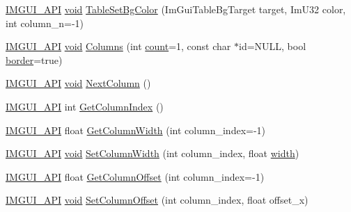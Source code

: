 \begin{DoxyCompactItemize}
\item 
\hyperlink{imgui_8h_a43829975e84e45d1149597467a14bbf5}{I\+M\+G\+U\+I\+\_\+\+A\+PI} \hyperlink{imgui__impl__opengl3__loader_8h_ac668e7cffd9e2e9cfee428b9b2f34fa7}{void} \hyperlink{namespaceImGui_ae8fa85b0cea3c12f73d9432cab64d50a}{Table\+Set\+Bg\+Color} (Im\+Gui\+Table\+Bg\+Target target, Im\+U32 color, int column\+\_\+n=-\/1)
\item 
\hyperlink{imgui_8h_a43829975e84e45d1149597467a14bbf5}{I\+M\+G\+U\+I\+\_\+\+A\+PI} \hyperlink{imgui__impl__opengl3__loader_8h_ac668e7cffd9e2e9cfee428b9b2f34fa7}{void} \hyperlink{namespaceImGui_a0e2889956542527c4039b6b8bf5c2a38}{Columns} (int \hyperlink{imgui__impl__opengl3__loader_8h_a619bc20e8198de3bd3f3d7fc34de66b2}{count}=1, const char $\ast$id=N\+U\+LL, bool \hyperlink{imgui__impl__opengl3__loader_8h_a04bf50a0ceff267d0040a99e545d74e9}{border}=true)
\item 
\hyperlink{imgui_8h_a43829975e84e45d1149597467a14bbf5}{I\+M\+G\+U\+I\+\_\+\+A\+PI} \hyperlink{imgui__impl__opengl3__loader_8h_ac668e7cffd9e2e9cfee428b9b2f34fa7}{void} \hyperlink{namespaceImGui_a8f97746d6a9d59c8400c26fb7613a2ff}{Next\+Column} ()
\item 
\hyperlink{imgui_8h_a43829975e84e45d1149597467a14bbf5}{I\+M\+G\+U\+I\+\_\+\+A\+PI} int \hyperlink{namespaceImGui_acc31f8eea4fcfb86edeb3ac12d82fc05}{Get\+Column\+Index} ()
\item 
\hyperlink{imgui_8h_a43829975e84e45d1149597467a14bbf5}{I\+M\+G\+U\+I\+\_\+\+A\+PI} float \hyperlink{namespaceImGui_a3d205d86dab5ca0763a92997283ac36e}{Get\+Column\+Width} (int column\+\_\+index=-\/1)
\item 
\hyperlink{imgui_8h_a43829975e84e45d1149597467a14bbf5}{I\+M\+G\+U\+I\+\_\+\+A\+PI} \hyperlink{imgui__impl__opengl3__loader_8h_ac668e7cffd9e2e9cfee428b9b2f34fa7}{void} \hyperlink{namespaceImGui_af17222ec47aebb5ede00be7b52de9f5d}{Set\+Column\+Width} (int column\+\_\+index, float \hyperlink{imgui__impl__opengl3__loader_8h_a6879d830f164725df67adeeabca3ea47}{width})
\item 
\hyperlink{imgui_8h_a43829975e84e45d1149597467a14bbf5}{I\+M\+G\+U\+I\+\_\+\+A\+PI} float \hyperlink{namespaceImGui_a79c22e9c5c208b6c9534a273be71a9e6}{Get\+Column\+Offset} (int column\+\_\+index=-\/1)
\item 
\hyperlink{imgui_8h_a43829975e84e45d1149597467a14bbf5}{I\+M\+G\+U\+I\+\_\+\+A\+PI} \hyperlink{imgui__impl__opengl3__loader_8h_ac668e7cffd9e2e9cfee428b9b2f34fa7}{void} \hyperlink{namespaceImGui_a8cc207211d6cf3f77b505e24aed4ebcc}{Set\+Column\+Offset} (int column\+\_\+index, float offset\+\_\+x)

\end{DoxyCompactItemize}

